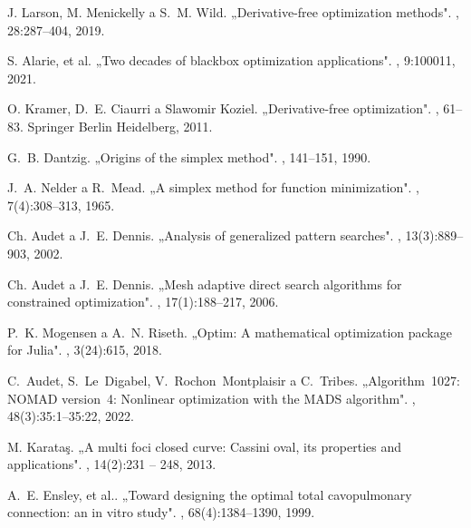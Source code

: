 \begin{thebibliography}{10}
	J. Larson, M. Menickelly a S.~M. Wild.
	\newblock „{D}erivative-free optimization methods".
	, 28:287--404, 2019.
	
	S. Alarie, et al.
	\newblock „{T}wo decades of blackbox optimization applications".
	, 9:100011, 2021.
	
	O. Kramer, D.~E. Ciaurri a Slawomir Koziel.
	\newblock „{D}erivative-free optimization".
	, 61--83. Springer Berlin Heidelberg, 2011.
	
	G.~B. Dantzig.
	\newblock „Origins of the simplex method". 
	, 141--151, 1990.
	
	J.~A. Nelder a R.~Mead.
	\newblock „{A} simplex method for function minimization".
	, 7(4):308--313, 1965.
	
	Ch. Audet a J.~E. Dennis.
	\newblock „{A}nalysis of generalized pattern searches".
	, 13(3):889--903, 2002.
	
	Ch. Audet a J.~E. Dennis.
	\newblock „{M}esh adaptive direct search algorithms for constrained optimization".
	, 17(1):188--217, 2006.
	
	P.~K. Mogensen a A.~N. Riseth.
	\newblock „{O}ptim: A mathematical optimization package for {Julia}".
	, 3(24):615, 2018.
	
	C.~Audet, S.~{Le~Digabel}, V.~{Rochon~Montplaisir} a C.~Tribes.
	\newblock „{Algorithm~1027: NOMAD version~4: Nonlinear optimization with the
		MADS algorithm}".
	, 48(3):35:1--35:22,
	2022.
	
	M. Karataş.
	\newblock „{A} multi foci closed curve: Cassini oval, its properties and
	applications".
	, 14(2):231 -- 248, 2013.
	
	A.~E. Ensley, et al..
	\newblock „{T}oward designing the optimal total cavopulmonary connection: an in
	vitro study".
	, 68(4):1384--1390, 1999.
	
\end{thebibliography}
